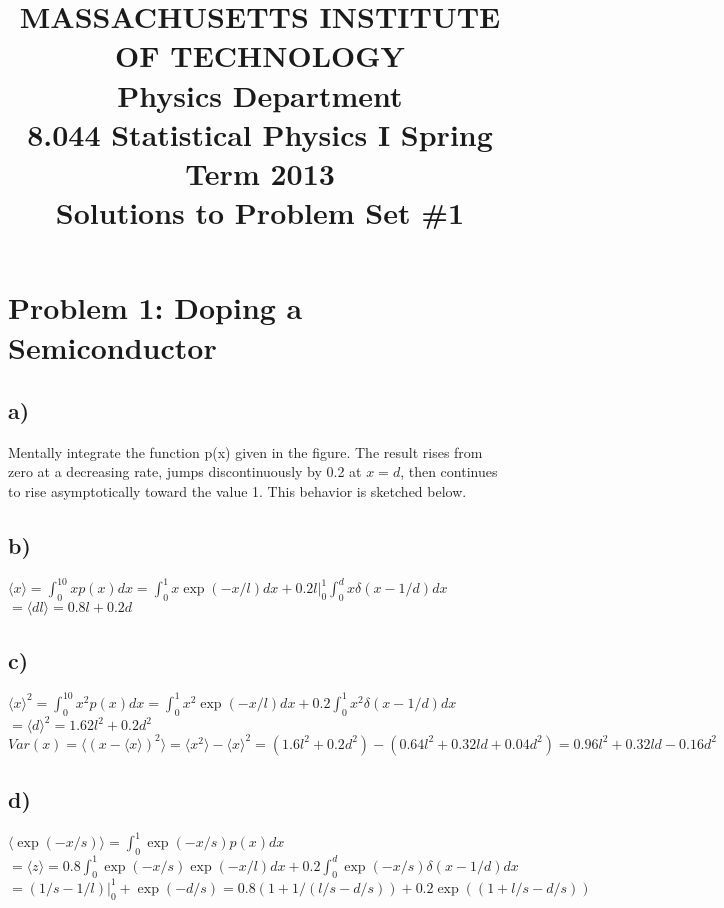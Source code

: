 \documentclass{article}
\begin{document}
\title{MASSACHUSETTS INSTITUTE OF TECHNOLOGY \\
       Physics Department \\
       8.044 Statistical Physics I Spring Term 2013 \\
       Solutions to Problem Set \#1}
\maketitle

\section{Problem 1: Doping a Semiconductor}
\subsection{a)}
Mentally integrate the function p(x) given in the figure. The result rises from zero at a decreasing rate, jumps discontinuously by 0.2 at $x=d$, then continues to rise asymptotically toward the value 1. This behavior is sketched below. \\
\subsection{b)}
$\langle x \rangle=\int_0^{10}xp(x)dx=\int_0^{1}x\exp(-x/l)dx+0.2l\vert_0^{1}\int_0^{d}x\delta(x-1/d)dx$ \\
$=\langle dl \rangle=0.8l+0.2d$ \\
\subsection{c)}
$\langle x \rangle^2=\int_0^{10}x^2p(x)dx=\int_0^{1}x^2\exp(-x/l)dx+0.2\int_0^{1}x^2\delta(x-1/d)dx$ \\
$=\langle d \rangle^2=1.62l^2+0.2d^2$ \\
$Var(x)=\langle(x-\langle x \rangle)^2 \rangle=\langle x^2 \rangle-\langle x \rangle^2 = (1.6l^2+0.2d^2)-(0.64l^2+0.32ld+0.04d^2)=0.96l^2+0.32ld-0.16d^2$ \\
\subsection{d)}
$\langle \exp(-x/s) \rangle=\int_0^{1}\exp(-x/s)p(x)dx$ \\
$=\langle z \rangle=0.8\int_0^{1}\exp(-x/s)\exp(-x/l)dx+0.2\int_0^{d}\exp(-x/s)\delta(x-1/d)dx$ \\
$=(1/s-1/l)\vert_0^{1}+\exp(-d/s)=0.8(1+1/(l/s-d/s))+0.2\exp((1+l/s-d/s))$
\end{document}
